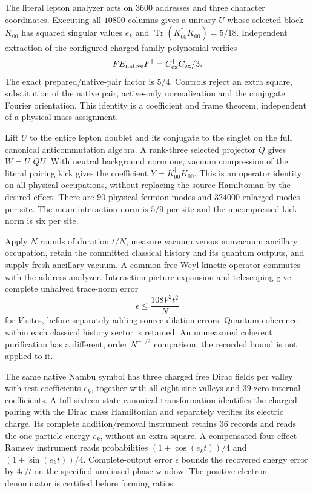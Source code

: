 The literal lepton analyzer acts on $3600$ addresses and three character
coordinates. Executing all $10800$ columns gives a unitary $U$ whose
selected block $K_{00}$ has squared singular values $e_k$ and
$\operatorname{Tr}(K_{00}^\dagger K_{00})=5/18$. Independent extraction
of the configured charged-family polynomial verifies
\[
 F E_{\rm native}F^\dagger=C_{\rm ex}^\dagger C_{\rm ex}/3.
\]
The exact prepared/native-pair factor is $5/4$. Controls reject an extra
square, substitution of the native pair, active-only normalization and
the conjugate Fourier orientation. This identity is a coefficient and
frame theorem, independent of a physical mass assignment.

Lift $U$ to the entire lepton doublet and its conjugate to the singlet
on the full canonical anticommutation algebra. A rank-three selected
projector $Q$ gives $W=U^\dagger Q U$. With neutral background norm one,
vacuum compression of the literal pairing kick gives the coefficient
$Y=K_{00}^\dagger K_{00}$. This is an operator identity on all physical
occupations, without replacing the source Hamiltonian by the desired
effect. There are $90$ physical fermion modes and $324000$ enlarged
modes per site. The mean interaction norm is $5/9$ per site and the
uncompressed kick norm is six per site.

Apply $N$ rounds of duration $t/N$, measure vacuum versus nonvacuum
ancillary occupation, retain the committed classical history and its
quantum outputs, and supply fresh ancillary vacuum. A common free Weyl
kinetic operator commutes with the address analyzer. Interaction-picture
expansion and telescoping give complete unhalved trace-norm error
\[
 \epsilon\le\frac{108 V^2t^2}{N}
\]
for $V$ sites, before separately adding source-dilation errors. Quantum
coherence within each classical history sector is retained. An unmeasured
coherent purification has a different, order $N^{-1/2}$ comparison;
the recorded bound is not applied to it.

The same native Nambu symbol has three charged free Dirac fields per
valley with rest coefficients $e_k$, together with all eight sine
valleys and $39$ zero internal coefficients. A full sixteen-state
canonical transformation identifies the charged pairing with the Dirac
mass Hamiltonian and separately verifies its electric charge. Its
complete addition/removal instrument retains $36$ records and reads
the one-particle energy $e_k$, without an extra square. A compensated
four-effect Ramsey instrument reads probabilities
$(1\pm\cos(e_kt))/4$ and $(1\pm\sin(e_kt))/4$. Complete-output error
$\epsilon$ bounds the recovered energy error by $4\epsilon/t$ on the
specified unaliased phase window. The positive electron denominator is
certified before forming ratios.

